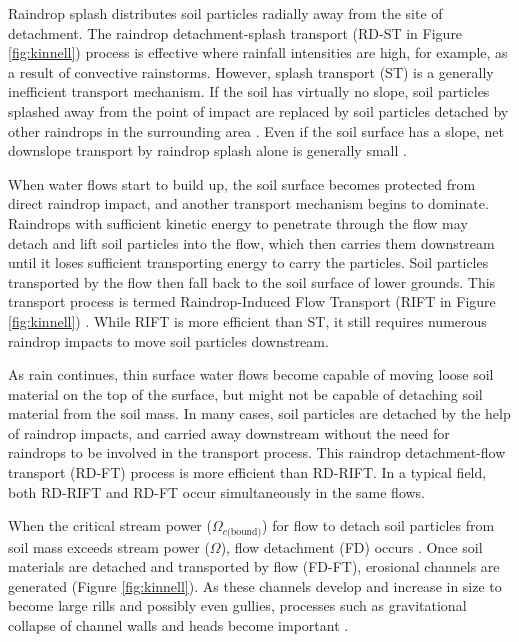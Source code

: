 Raindrop splash distributes soil particles radially away from the site of
detachment. The raindrop detachment-splash transport (RD-ST in Figure
\ref{fig:kinnell}) process is effective where rainfall intensities are high, for
example, as a result of convective rainstorms. However, splash transport (ST) is
a generally inefficient transport mechanism. If the soil has virtually no slope,
soil particles splashed away from the point of impact are replaced by soil
particles detached by other raindrops in the surrounding area
\citep{kinnell2000-discourse,zartl2001-25}. Even if the soil surface has a
slope, net downslope transport by raindrop splash alone is generally small
\citep{kinnell2001-749}.

When water flows start to build up, the soil surface becomes protected from
direct raindrop impact, and another transport mechanism begins to dominate.
Raindrops with sufficient kinetic energy to penetrate through the flow may
detach and lift soil particles into the flow, which then carries them downstream
until it loses sufficient transporting energy to carry the particles. Soil
particles transported by the flow then fall back to the soil surface of lower
grounds. This transport process is termed Raindrop-Induced Flow Transport (RIFT
in Figure \ref{fig:kinnell}) \citep{kinnell1990-497}. While RIFT is more
efficient than ST, it still requires numerous raindrop impacts to move soil
particles downstream.

As rain continues, thin surface water flows become capable of moving loose soil
material on the top of the surface, but might not be capable of detaching soil
material from the soil mass. In many cases, soil particles are detached by the
help of raindrop impacts, and carried away downstream without the need for
raindrops to be involved in the transport process. This raindrop detachment-flow
transport (RD-FT) process is more efficient than RD-RIFT. In a typical field,
both RD-RIFT and RD-FT occur simultaneously in the same flows.

When the critical stream power ($\Omega_{c\textrm{(bound)}}$) for flow to detach
soil particles from soil mass exceeds stream power ($\Omega$), flow detachment
(FD) occurs \citep{kinnell2000-discourse}. Once soil materials are detached and
transported by flow (FD-FT), erosional channels are generated (Figure
\ref{fig:kinnell}). As these channels develop and increase in size to become
large rills and possibly even gullies, processes such as gravitational collapse
of channel walls and heads become important \citep{boardman2003-165}.

